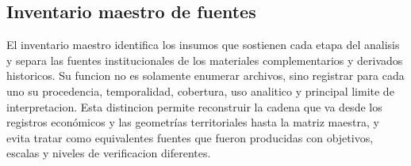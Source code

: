 \documentclass[11pt,letterpaper]{article}
\begin{document}
\subsection{Inventario maestro de fuentes}

El inventario maestro identifica los insumos que sostienen cada etapa del analisis y separa las fuentes institucionales de los materiales complementarios y derivados historicos. Su funcion no es solamente enumerar archivos, sino registrar para cada uno su procedencia, temporalidad, cobertura, uso analitico y principal limite de interpretacion. Esta distincion permite reconstruir la cadena que va desde los registros económicos y las geometrías territoriales hasta la matriz maestra, y evita tratar como equivalentes fuentes que fueron producidas con objetivos, escalas y niveles de verificacion diferentes.
\end{document}
